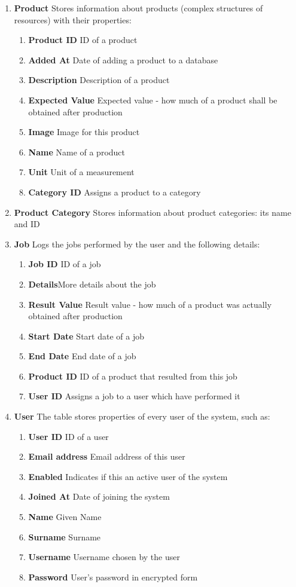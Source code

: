 \documentclass[a4paper,11pt,twoside]{report}
\theoremstyle{definition}
\begin{document}
\begin{enumerate}
\item \textbf{Product} Stores information about products (complex structures of resources) with their properties:
\begin{enumerate}
\item \textbf{Product ID} ID of a product
\item \textbf{Added At} Date of adding a product to a database
\item \textbf{Description} Description of a product
\item \textbf{Expected Value} Expected value - how much of a product shall be obtained after production
\item \textbf{Image} Image for this product
\item \textbf{Name} Name of a product
\item \textbf{Unit} Unit of a measurement
\item \textbf{Category ID} Assigns a product to a category
\end{enumerate}

\item \textbf{Product Category} Stores information about product categories: its name and ID

\item \textbf{Job} Logs the jobs performed by the user and the following details:
\begin{enumerate}
\item \textbf{Job ID} ID of a job
\item \textbf{Details}More details about the job
\item \textbf{Result Value} Result value - how much of a product was actually obtained after production
\item \textbf{Start Date} Start date of a job
\item \textbf{End Date} End date of a job
\item \textbf{Product ID} ID of a product that resulted from this job
\item \textbf{User ID} Assigns a job to a user which have performed it
\end{enumerate}

\item \textbf{User} The table stores properties of every user of the system, such as:
\begin{enumerate}
\item \textbf{User ID} ID of a user
\item \textbf{Email address} Email address of this user
\item \textbf{Enabled} Indicates if this an active user of the system
\item \textbf{Joined At} Date of joining the system
\item \textbf{Name} Given Name
\item \textbf{Surname} Surname
\item \textbf{Username} Username chosen by the user
\item \textbf{Password} User's password in encrypted form
\end{enumerate}


\end{enumerate}
\end{document}

